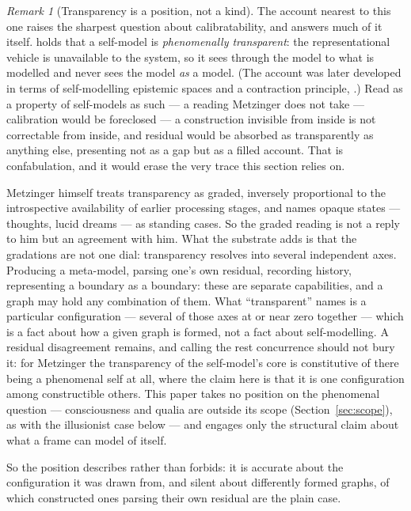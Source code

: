 \documentclass[11pt,a4paper]{article}
\theoremstyle{remark}\newtheorem{remark}[definition]{Remark}
\begin{document}
\begin{remark}[Transparency is a position, not a kind]\label{rem:transparency}
The account nearest to this one raises the sharpest question about calibratability, and
answers much of it itself.
\citet{metzinger2003} holds that a self-model is \emph{phenomenally transparent}: the
representational vehicle is unavailable to the system, so it sees through the model to what is
modelled and never sees the model \emph{as} a model. (The account was later
developed in terms of self-modelling epistemic spaces and a contraction principle,
\citealp{metzinger2020}.) Read as a property of self-models as such --- a reading
Metzinger does not take --- calibration would be foreclosed --- a construction invisible from inside is not correctable from inside,
and residual would be absorbed as transparently as anything else, presenting not as a gap but as a
filled account. That is confabulation, and it would erase the very trace this section relies on.

Metzinger himself treats transparency as graded, inversely proportional to the introspective
availability of earlier processing stages, and names opaque states --- thoughts, lucid dreams ---
as standing cases. So the graded reading is not a reply to him but an agreement with him. What the
substrate adds is that the gradations are not one dial: transparency resolves into several
independent axes.
Producing a meta-model, parsing one's own residual, recording history, representing a boundary as
a boundary: these are separate capabilities, and a graph may hold any combination of them. What
``transparent'' names is a particular configuration --- several of those axes at or near zero
together --- which is a fact about how a given graph is formed, not a fact about self-modelling.
A residual disagreement remains, and calling the rest concurrence should not bury it: for
Metzinger the transparency of the self-model's core is constitutive of there being a phenomenal
self at all, where the claim here is that it is one configuration among constructible others.
This paper takes no position on the phenomenal question --- consciousness and qualia are outside
its scope (Section~\ref{sec:scope}), as with the illusionist case below --- and engages only the
structural claim about what a frame can model of itself.

So the position describes rather than forbids: it is accurate about the configuration it was
drawn from, and silent about differently formed graphs, of which constructed ones parsing their
own residual are the plain case.


\end{remark}
\end{document}
